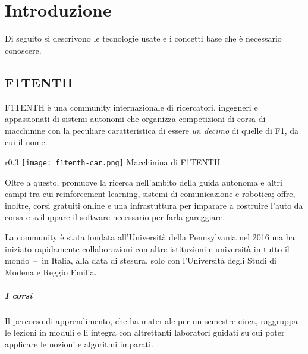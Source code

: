 \chapter{Introduzione}

Di seguito si descrivono le tecnologie usate e i concetti base che è necessario conoscere.

\section{F1TENTH}
F1TENTH è una community internazionale di ricercatori, ingegneri e appassionati di sistemi autonomi
che organizza competizioni di corsa di macchinine con la peculiare caratteristica
di essere \textit{un decimo} di quelle di F1, da cui il nome.
\begin{wrapfigure}{r}{0.3\textwidth}
	\centering
	\texttt{[image: f1tenth-car.png]}
	{\footnotesize Macchinina di F1TENTH}
\end{wrapfigure}
Oltre a questo, promuove la ricerca nell'ambito della guida autonoma
e altri campi tra cui reinforcement learning, sistemi di comunicazione e robotica;
offre, inoltre, corsi gratuiti online e una infrastuttura per imparare a costruire l'auto da corsa
e sviluppare il software necessario per farla gareggiare. \cite{ftenth-web}

La community è stata fondata all'Università della Pennsylvania nel 2016 ma ha iniziato rapidamente
collaborazioni con altre istituzioni e università in tutto il mondo~--~in Italia, alla data di stesura, solo
con l'Università degli Studi di Modena e Reggio Emilia.

\paragraph{I corsi}
Il percorso di apprendimento, che ha materiale per un semestre circa,
raggruppa le lezioni in moduli e li integra con altrettanti laboratori guidati
su cui poter applicare le nozioni e algoritmi imparati.

